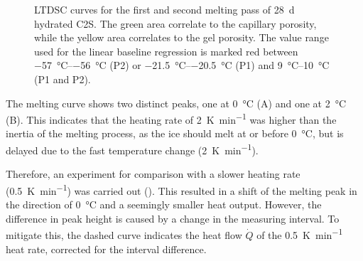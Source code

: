 \begin{figure}[!htb]

    \caption{
		\ac{LTDSC} curves for the first and second melting pass of \qty{28}{\day} hydrated \ac{C2S}.
		The {\color{green}green} area correlate to the capillary porosity, while the {\color{orange}yellow} area correlates to the gel porosity.
		The value range used for the linear baseline regression is marked {\color{red}red} between \qtyrange{-57}{-56}{\celsius} (P2) or \qtyrange{-21.5}{-20.5}{\celsius} (P1) and \qtyrange{9}{10}{\celsius} (P1 and P2).
	}
    \label{fig:ltdsc_result_c2s_melt}
\end{figure}


The melting curve shows two distinct peaks, one at \qty{0}{\celsius} (A) and one at \qty{2}{\celsius} (B).
This indicates that the heating rate of \qty{2}{\kelvin\per\minute} was higher than the inertia of the melting process, as the ice should melt at or before \qty{0}{\celsius}, but is delayed due to the fast temperature change (\qty{2}{\kelvin\per\minute}).

Therefore, an experiment for comparison with a slower heating rate (\qty{0.5}{\kelvin\per\minute}) was carried out ().
This resulted in a shift of the melting peak in the direction of \qty{0}{\celsius} and a seemingly smaller heat output.
However, the difference in peak height is caused by a change in the measuring interval.
To mitigate this, the dashed curve indicates the heat flow $\dot{Q}$ of the \qty{0.5}{\kelvin\per\minute} heat rate, corrected for the interval difference. %


